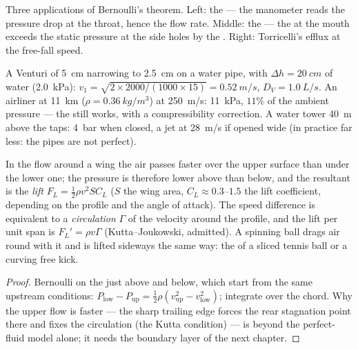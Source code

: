 \begin{omfigure}
{\small Three applications of Bernoulli's theorem. Left: the  --- the manometer reads the pressure drop at the throat, hence the
flow rate. Middle: the  --- the  at the
mouth exceeds the static pressure at the side holes by the . Right: Torricelli's efflux at the free-fall speed.}
\end{omfigure}

\begin{example}[Numbers]\label{ex:b2:euler-bernoulli:numbers}
A Venturi of \qty{5}{cm} narrowing to \qty{2.5}{cm} on a water pipe, with
$\Delta h = \qty{20}{cm}$ of water (\qty{2.0}{kPa}): $v_1 = \sqrt{2 \times 2000/
(1000 \times 15)} = \qty{0.52}{m/s}$, $D_V = \qty{1.0}{L/s}$. An airliner at
\qty{11}{km} ($\rho = \qty{0.36}{kg/m^3}$) at \qty{250}{m/s}: 
\qty{11}{kPa}, $11\%$ of the ambient pressure --- the  still
works, with a compressibility correction. A water tower \qty{40}{m}
above the taps: \qty{4}{bar} when closed, a jet at \qty{28}{m/s} if opened
wide (in practice far less: the pipes are not perfect).
\end{example}

\begin{proposition}\label{prop:b2:euler-bernoulli:lift}
In the flow around a wing the air passes faster over the upper
surface than under the lower one; the pressure is therefore lower
above than below, and the resultant is the \emph{lift} $F_L =
\tfrac12\rho v^2SC_L$ ($S$ the wing area, $C_L \approx 0.3$--$1.5$ the lift
coefficient, depending on the profile and the angle of attack). The
speed difference is equivalent to a \emph{circulation} $\Gamma$ of the
velocity around the profile, and the lift per unit span is $F_L' =
\rho v\Gamma$ (Kutta--Joukowski, admitted). A spinning ball drags air
round with it and is lifted sideways the same way: the \emph{} of a sliced tennis ball or a curving free kick.
\end{proposition}

\begin{proof}
Bernoulli on the  just above and below, which start from the
same upstream conditions: $P_{\text{low}} - P_{\text{up}} = \tfrac12\rho
(v_{\text{up}}^2 - v_{\text{low}}^2)$; integrate over the chord. Why the
upper flow is faster --- the sharp trailing edge forces the rear
stagnation point there and fixes the circulation (the Kutta condition)
--- is beyond the perfect-fluid model alone; it needs the boundary layer
of the next chapter.
\end{proof}

